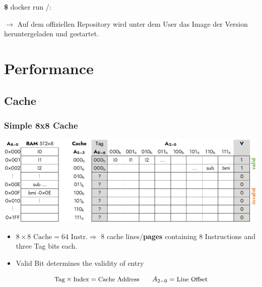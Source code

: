 \documentclass[
  10pt,
  a4paper,
]{article}
\newenvironment{Shaded}{}{}
\newcommand{\ExtensionTok}[1]{\textcolor[rgb]{0.84,0.23,0.29}{\textbf{#1}}}
\newcommand{\NormalTok}[1]{\textcolor[rgb]{0.14,0.16,0.18}{#1}}
\providecommand{\tightlist}{%
  \setlength{\itemsep}{0pt}\setlength{\parskip}{0pt}}\usepackage{longtable,booktabs,array}
\begin{document}
\begin{multicols*}{2}
\begin{Shaded}
\begin{Highlighting}[]
\ExtensionTok{\$}\NormalTok{ docker run }\textbf{\texttt{\color{OliveGreen}{kaohslu}}}/\textbf{\texttt{\color{NavyBlue}{01-demo-img}}}:\textbf{\texttt{\color{Periwinkle}{latest}}}
\end{Highlighting}
\end{Shaded}

\(\rightarrow\) Auf dem offiziellen Repository
\textbf{\texttt{\color{BrickRed}{DockerHub}}} wird unter dem User
\textbf{\texttt{\color{OliveGreen}{kaohslu}}} das Image
\textbf{\texttt{\color{NavyBlue}{01-demo-img}}} der Version
\textbf{\texttt{\color{Periwinkle}{latest}}} heruntergeladen und
gestartet.

\newpage

\section{Performance}\label{performance}

\subsection{Cache}\label{cache}

\subsubsection{Simple 8x8 Cache}\label{simple-8x8-cache}

\includegraphics{images/performance/image-8.png}

\begin{itemize}
\tightlist
\item
  \(8\times 8\text{ Cache}=64\text{ Instr.}\Rightarrow\) 8 cache
  lines/\textbf{pages} containing 8 Instructions and three Tag bits
  each.
\item
  Valid Bit determines the validity of entry
\end{itemize}

\[
\small\text{Tag}\times\text{Index}=\text{Cache Address}\qquad A_{2-0}=\text{Line Offset}
\]


\end{multicols*}
\end{document}
